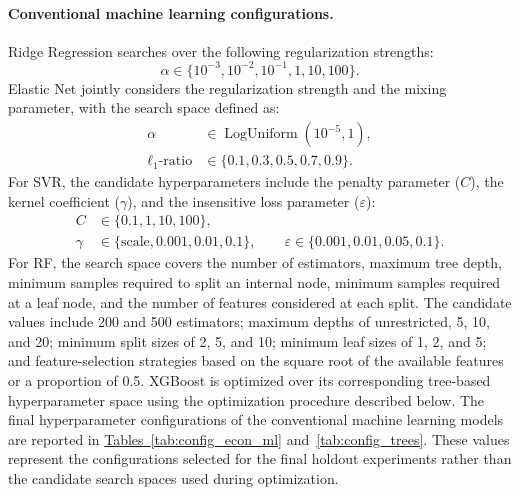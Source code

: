 \documentclass[12pt,twoside]{ord}
\begin{document}
\paragraph{Conventional machine learning configurations.} Ridge Regression searches over the following regularization strengths:
\begin{equation}
\alpha \in \{10^{-3},10^{-2},10^{-1},1,10,100\}.
\end{equation}
Elastic Net jointly considers the regularization strength and the mixing parameter, with the search space defined as:
\begin{equation}
\begin{aligned}
\alpha &\in \operatorname{LogUniform}(10^{-5},1),\\
\ell_1\text{-ratio} &\in \{0.1,0.3,0.5,0.7,0.9\}.
\end{aligned}
\end{equation}
For SVR, the candidate hyperparameters include the penalty parameter ($C$), the kernel coefficient ($\gamma$), and the insensitive loss parameter ($\varepsilon$):
\begin{equation}
\begin{aligned}
C &\in \{0.1,1,10,100\},\\
\gamma &\in \{\text{scale},0.001,0.01,0.1\},
\qquad
\varepsilon \in \{0.001,0.01,0.05,0.1\}.
\end{aligned}
\end{equation}
For RF, the search space covers the number of estimators, maximum tree depth, minimum samples required to split an internal node, minimum samples required at a leaf node, and the number of features considered at each split. The candidate values include 200 and 500 estimators; maximum depths of unrestricted, 5, 10, and 20; minimum split sizes of 2, 5, and 10; minimum leaf sizes of 1, 2, and 5; and feature-selection strategies based on the square root of the available features or a proportion of 0.5. XGBoost is optimized over its corresponding tree-based hyperparameter space using the optimization procedure described below. The final hyperparameter configurations of the conventional machine learning models are reported in \hyperref[tab:config_econ_ml]{Tables~\ref*{tab:config_econ_ml}} and~\hyperref[tab:config_trees]{\ref*{tab:config_trees}}. These values represent the configurations selected for the final holdout experiments rather than the candidate search spaces used during optimization.
\end{document}
